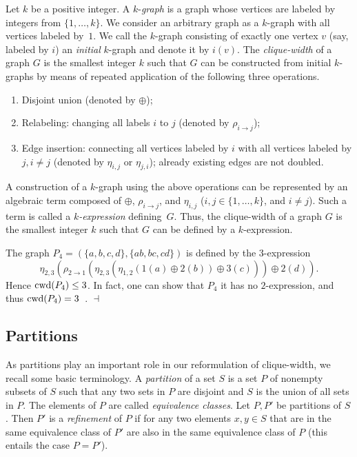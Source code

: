 \documentclass[10pt,usletter]{article}
\theoremstyle{remark}
\newtheorem{example}{Example}
\renewenvironment{example}{\begin{ex}}{\hfill
    $\dashv$\end{ex}\medskip}
\newcommand{\cwd}{\text{\normalfont cwd}}
\newcommand{\hy}{\hbox{-}\nobreak\hskip0pt}
\begin{document}
Let $k$ be a positive integer. A $k$-\emph{graph} is a graph whose
vertices are labeled by integers from $\{1,\dots,k\}$.  We consider an
arbitrary graph as a $k$\hy graph with all vertices labeled by~$1$.
We call the $k$-graph consisting of exactly one vertex $v$ (say,
labeled by $i$) an \emph{initial} $k$-graph and denote it by $i(v)$.
The \emph{clique-width} of a graph $G$ is the smallest integer $k$
such that $G$ can be constructed from initial $k$-graphs by means of
repeated application of the following three operations.
\begin{enumerate}
\item Disjoint union (denoted by $\oplus$);
\item Relabeling: changing all labels $i$ to $j$ (denoted by $\rho_{i
    \rightarrow j}$);
\item Edge insertion: connecting all vertices labeled by $i$ with all
  vertices labeled by $j, i \neq j$ (denoted by $\eta_{i,j}$ or
  $\eta_{j,i}$); already existing edges are not doubled.
\end{enumerate}
A construction of a $k$\hy graph using the above operations can be
represented by an algebraic term composed of $\oplus$, $\rho_{i
  \rightarrow j}$, and $\eta_{i,j}$ ($i,j\in \{1,\dots,k\}$, and
$i\neq j$).  Such a term is called a \emph{$k$\hy expression}
defining~$G$.  Thus, the clique-width of a graph $G$ is the smallest
integer $k$ such that $G$ can be defined by a $k$\hy expression.
\begin{example}\label{ex:p4}
  The graph $P_4=(\{a,b,c,d\},\{ab, bc, cd\})$ is defined by the
  $3$\hy expression\[ \eta_{2,3}( \rho_{2\rightarrow 1}(
    \eta_{2,3}( \eta_{1,2}(1(a) \oplus 2(b)) \oplus 3(c) ) ) \oplus
    2(d) ).
\]
Hence $\cwd(P_4)\leq 3$. In fact, one can show that $P_4$ it has no
$2$\hy expression, and thus $\cwd(P_4)=3$~\cite{CourcelleOlariu00}.
\end{example}



\subsection{Partitions}

As partitions play an important role in our reformulation of
clique-width, we recall some basic terminology. A \emph{partition} of
a set $S$ is a set $P$ of nonempty subsets of $S$ such that any two
sets in $P$ are disjoint and $S$ is the union of all sets in $P$. The
elements of $P$ are called \emph{equivalence classes}.  Let $P,P'$ be
partitions of $S$. Then $P'$ is a \emph{refinement} of $P$ if for any
two elements $x,y\in S$ that are in the same equivalence class of $P'$
are also in the same equivalence class of $P$ (this entails the case
$P=P'$).
 
\end{document}

